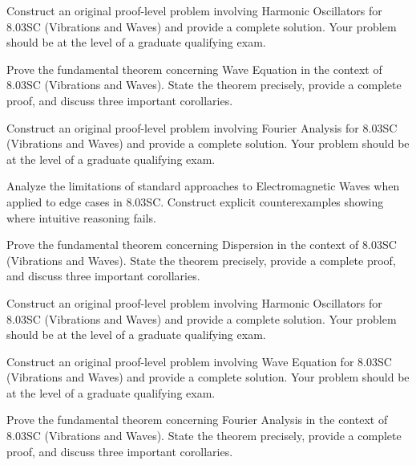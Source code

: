 \documentclass[12pt,a4paper]{exam}
\begin{document}
\begin{questions}

\question[3]
Construct an original proof-level problem involving Harmonic Oscillators for 8.03SC (Vibrations and Waves) and provide a complete solution. Your problem should be at the level of a graduate qualifying exam.

\vspace{0.3cm}

\question[3]
Prove the fundamental theorem concerning Wave Equation in the context of 8.03SC (Vibrations and Waves). State the theorem precisely, provide a complete proof, and discuss three important corollaries.

\vspace{0.3cm}

\question[4]
Construct an original proof-level problem involving Fourier Analysis for 8.03SC (Vibrations and Waves) and provide a complete solution. Your problem should be at the level of a graduate qualifying exam.

\vspace{0.3cm}

\question[2]
Analyze the limitations of standard approaches to Electromagnetic Waves when applied to edge cases in 8.03SC. Construct explicit counterexamples showing where intuitive reasoning fails.

\vspace{0.3cm}

\question[3]
Prove the fundamental theorem concerning Dispersion in the context of 8.03SC (Vibrations and Waves). State the theorem precisely, provide a complete proof, and discuss three important corollaries.

\vspace{0.3cm}

\question[5]
Construct an original proof-level problem involving Harmonic Oscillators for 8.03SC (Vibrations and Waves) and provide a complete solution. Your problem should be at the level of a graduate qualifying exam.

\vspace{0.3cm}

\question[6]
Construct an original proof-level problem involving Wave Equation for 8.03SC (Vibrations and Waves) and provide a complete solution. Your problem should be at the level of a graduate qualifying exam.

\vspace{0.3cm}

\question[3]
Prove the fundamental theorem concerning Fourier Analysis in the context of 8.03SC (Vibrations and Waves). State the theorem precisely, provide a complete proof, and discuss three important corollaries.


\end{questions}
\end{document}
